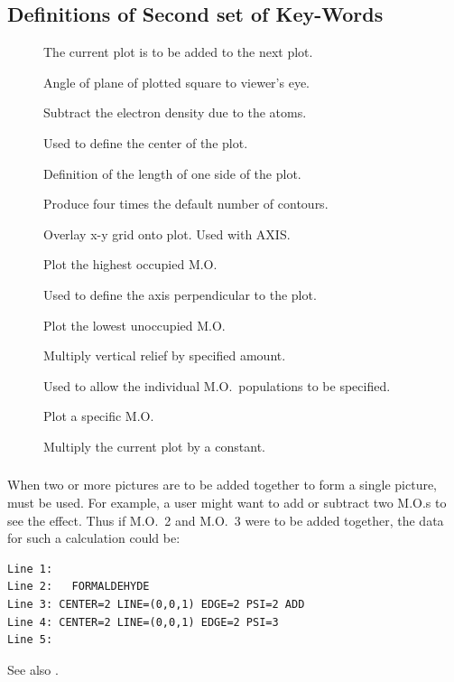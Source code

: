 \subsection{Definitions of Second set of Key-Words}
\begin{description}
\item[] The current plot is to be added to the next plot.
\item[] Angle of plane of plotted square to viewer's eye.
\item[] Subtract the electron density due to the atoms.
\item[] Used to define the center of the plot.
\item[] Definition of the length of one side of the plot.
\item[] Produce four times the default number of contours.
\item[] Overlay x-y grid onto plot. Used with AXIS.
\item[] Plot the highest occupied M.O.
\item[] Used to define the axis perpendicular to the plot.
\item[] Plot the lowest unoccupied M.O.
\item[] Multiply vertical relief by specified amount.
\item[] Used to allow the individual M.O.\ populations to be specified.
\item[] Plot a specific M.O.
\item[] Multiply the current plot by a constant.
\end{description}

\subsubsection*{}
When two or more pictures are to be added together to form a single picture,
 must be used. For example, a user might want to add or subtract
two M.O.s to see the effect. Thus if M.O.\ 2 and M.O.\ 3 were to be
added together, the data for such a calculation could be:
\begin{verbatim}
Line 1:
Line 2:   FORMALDEHYDE
Line 3: CENTER=2 LINE=(0,0,1) EDGE=2 PSI=2 ADD
Line 4: CENTER=2 LINE=(0,0,1) EDGE=2 PSI=3
Line 5:
\end{verbatim}
See also .

